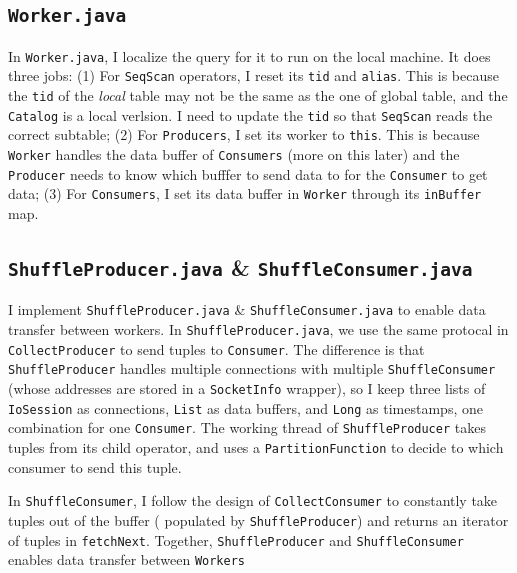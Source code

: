 \documentclass[12pt]{myland}
\def\<#1>{\texttt{#1}}
\begin{document}
    \subsection{\<Worker.java>}
    In \<Worker.java>, I localize the query for it to run on the local machine. It does three jobs: (1) For \<SeqScan>
    operators, I reset its \<tid> and \<alias>. This is because the \<tid> of the \emph{local} table may not be the
    same as the one of global table, and the \<Catalog> is a local verlsion. I need to update the \<tid> so that
    \<SeqScan> reads the correct subtable; (2) For \<Producers>, I set its worker to \<this>. This is because \<Worker>
    handles the data buffer of \<Consumers> (more on this later) and the \<Producer> needs to know which bufffer to send
    data to for the \<Consumer> to get data; (3) For \<Consumers>, I set its data buffer in \<Worker> through its
    \<inBuffer> map.

    \subsection{\<ShuffleProducer.java> \& \<ShuffleConsumer.java>}
    I implement \<ShuffleProducer.java> \& \<ShuffleConsumer.java> to enable data transfer between workers. In
    \<ShuffleProducer.java>, we use the same protocal in \<CollectProducer> to send tuples to \<Consumer>. The difference
    is that \<ShuffleProducer> handles multiple connections with multiple \<ShuffleConsumer> (whose addresses
    are stored in a \<SocketInfo> wrapper), so I keep three lists of \<IoSession> as connections, \<List> as data buffers,
    and \<Long> as timestamps, one combination for one \<Consumer>. The working thread of \<ShuffleProducer> takes
    tuples from its child operator, and uses a \<PartitionFunction> to decide to which consumer to send this tuple. \par

    In \<ShuffleConsumer>, I follow the design of \<CollectConsumer> to constantly take tuples out of the buffer (
    populated by \<ShuffleProducer>) and returns an iterator of tuples in \texttt{fetchNext}. Together, \<ShuffleProducer>
    and \<ShuffleConsumer> enables data transfer between \<Workers>
\end{document}
